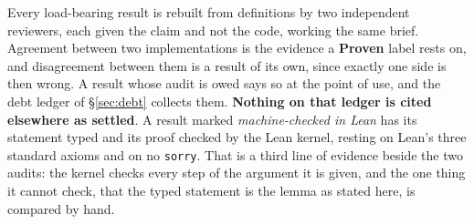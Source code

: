 Every load-bearing result is rebuilt from definitions by two independent reviewers, each given the claim and not the code, working the same brief. Agreement between two implementations is the evidence a \textbf{Proven} label rests on, and disagreement between them is a result of its own, since exactly one side is then wrong. A result whose audit is owed says so at the point of use, and the debt ledger of \S\ref{sec:debt} collects them. \textbf{Nothing on that ledger is cited elsewhere as settled}. A result marked \emph{machine-checked in Lean} has its statement typed and its proof checked by the Lean kernel, resting on Lean's three standard axioms and on no \texttt{sorry}. That is a third line of evidence beside the two audits: the kernel checks every step of the argument it is given, and the one thing it cannot check, that the typed statement is the lemma as stated here, is compared by hand.


